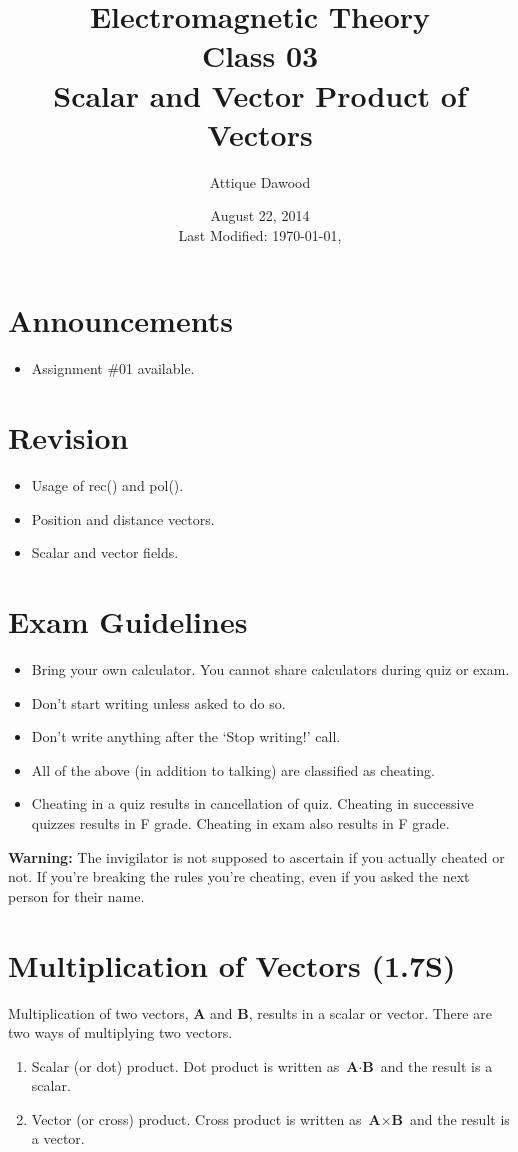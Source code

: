 \documentclass[12pt,a4paper]{article}
\title{Electromagnetic Theory\\Class 03\\Scalar and Vector Product of Vectors}
\author{Attique Dawood}
\date{August 22, 2014\\[0.2cm] Last Modified: \today, \currenttime}
\begin{document}
\maketitle
\section{Announcements}
\begin{itemize}
\item Assignment \#01 available.
\end{itemize}
\section{Revision}
\begin{itemize}
\item Usage of rec() and pol().
\item Position and distance vectors.
\item Scalar and vector fields.
\end{itemize}
\section{Exam Guidelines}
\begin{itemize}
\item Bring your own calculator. You cannot share calculators during quiz or exam.
\item Don't start writing unless asked to do so.
\item Don't write anything after the `Stop writing!' call.
\item All of the above (in addition to talking) are classified as cheating.
\item Cheating in a quiz results in cancellation of quiz. Cheating in successive quizzes results in F grade. Cheating in exam also results in F grade.
\end{itemize}
\textbf{Warning:} The invigilator is not supposed to ascertain if you actually cheated or not. If you're breaking the rules you're cheating, even if you asked the next person for their name.
\section{Multiplication of Vectors (1.7S)}
Multiplication of two vectors, \textbf{A} and \textbf{B}, results in a scalar or vector. There are two ways of multiplying two vectors.
\begin{enumerate}
\item Scalar (or dot) product. Dot product is written as $\textbf{A}\cdot \textbf{B}$ and the result is a scalar.
\item Vector (or cross) product. Cross product is written as $\textbf{A}\times \textbf{B}$ and the result is a vector.
\end{enumerate}
\end{document}
